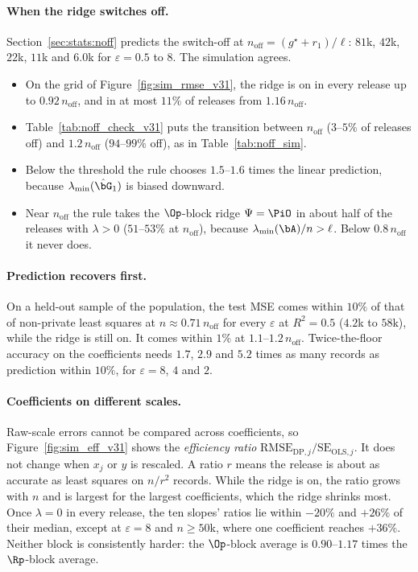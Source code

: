 \paragraph{When the ridge switches off.} Section~\ref{sec:stats:noff} predicts the switch-off at $n_{\mathrm{off}} = (g^\star + r_1)/\ell$: $81$k, $42$k, $22$k, $11$k and $6.0$k for $\varepsilon = 0.5$ to $8$. The simulation agrees.
\begin{itemize}[noitemsep]
  \item On the grid of Figure~\ref{fig:sim_rmse_v31}, the ridge is on in every release up to $0.92\,n_{\mathrm{off}}$, and in at most $11\%$ of releases from $1.16\,n_{\mathrm{off}}$.
  \item Table~\ref{tab:noff_check_v31} puts the transition between $n_{\mathrm{off}}$ ($3$--$5\%$ of releases off) and $1.2\,n_{\mathrm{off}}$ ($94$--$99\%$ off), as in Table~\ref{tab:noff_sim}.
  \item Below the threshold the rule chooses $1.5$--$1.6$ times the linear prediction, because $\lambda_{\min}(\hat\bG_1)$ is biased downward.
  \item Near $n_{\mathrm{off}}$ the rule takes the $\Op$-block ridge $\Psi = \PiO$ in about half of the releases with $\lambda > 0$ ($51$--$53\%$ at $n_{\mathrm{off}}$), because $\lambda_{\min}(\bA)/n > \ell$. Below $0.8\,n_{\mathrm{off}}$ it never does.
\end{itemize}

\paragraph{Prediction recovers first.} On a held-out sample of the population, the test MSE comes within $10\%$ of that of non-private least squares at $n \approx 0.71\,n_{\mathrm{off}}$ for every $\varepsilon$ at $R^2 = 0.5$ ($4.2$k to $58$k), while the ridge is still on. It comes within $1\%$ at $1.1$--$1.2\,n_{\mathrm{off}}$. Twice-the-floor accuracy on the coefficients needs $1.7$, $2.9$ and $5.2$ times as many records as prediction within $10\%$, for $\varepsilon = 8$, $4$ and $2$.

\paragraph{Coefficients on different scales.} Raw-scale errors cannot be compared across coefficients, so Figure~\ref{fig:sim_eff_v31} shows the \emph{efficiency ratio} $\mathrm{RMSE}_{\mathrm{DP},j}/\mathrm{SE}_{\mathrm{OLS},j}$. It does not change when $x_j$ or $y$ is rescaled. A ratio $r$ means the release is about as accurate as least squares on $n/r^2$ records. While the ridge is on, the ratio grows with $n$ and is largest for the largest coefficients, which the ridge shrinks most. Once $\lambda = 0$ in every release, the ten slopes' ratios lie within $-20\%$ and $+26\%$ of their median, except at $\varepsilon = 8$ and $n \ge 50$k, where one coefficient reaches $+36\%$. Neither block is consistently harder: the $\Op$-block average is $0.90$--$1.17$ times the $\Rp$-block average.

